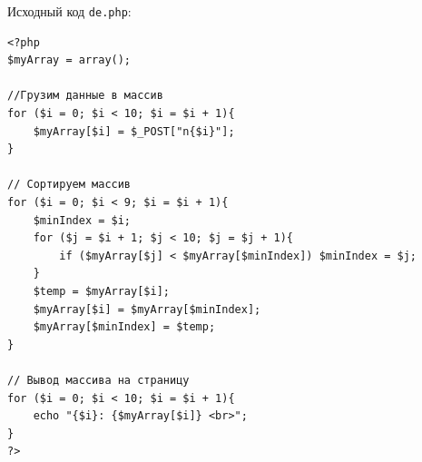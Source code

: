 Исходный код \verb|de.php|:

\begin{verbatim}
<?php
$myArray = array();

//Грузим данные в массив
for ($i = 0; $i < 10; $i = $i + 1){
    $myArray[$i] = $_POST["n{$i}"];
}

// Сортируем массив
for ($i = 0; $i < 9; $i = $i + 1){
    $minIndex = $i;
    for ($j = $i + 1; $j < 10; $j = $j + 1){
        if ($myArray[$j] < $myArray[$minIndex]) $minIndex = $j;
    }
    $temp = $myArray[$i];
    $myArray[$i] = $myArray[$minIndex];
    $myArray[$minIndex] = $temp;
}

// Вывод массива на страницу
for ($i = 0; $i < 10; $i = $i + 1){
    echo "{$i}: {$myArray[$i]} <br>";
}
?>
\end{verbatim}
